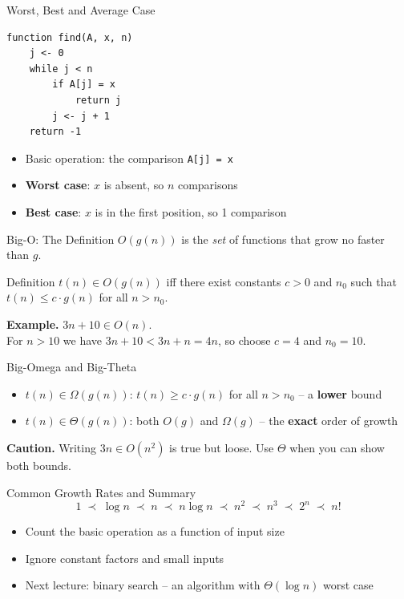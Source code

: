 \documentclass[aspectratio=169,11pt]{beamer}
\begin{document}
\begin{frame}[fragile]{Worst, Best and Average Case}
\begin{verbatim}
function find(A, x, n)
    j <- 0
    while j < n
        if A[j] = x
            return j
        j <- j + 1
    return -1
\end{verbatim}
  \begin{itemize}
    \item Basic operation: the comparison \verb|A[j] = x|
    \item \textbf{Worst case}: $x$ is absent, so $n$ comparisons
    \item \textbf{Best case}: $x$ is in the first position, so 1 comparison
  \end{itemize}
\end{frame}

\begin{frame}{Big-O: The Definition}
  $O(g(n))$ is the \emph{set} of functions that grow no faster than $g$.
  \begin{block}{Definition}
    $t(n) \in O(g(n))$ iff there exist constants $c > 0$ and $n_0$ such that
    $t(n) \le c \cdot g(n)$ for all $n > n_0$.
  \end{block}
  \textbf{Example.} $3n + 10 \in O(n)$.\\
  For $n > 10$ we have $3n + 10 < 3n + n = 4n$, so choose $c = 4$ and $n_0 = 10$.
\end{frame}

\begin{frame}{Big-Omega and Big-Theta}
  \begin{itemize}
    \item $t(n) \in \Omega(g(n))$: $t(n) \ge c \cdot g(n)$ for all $n > n_0$ -- a \textbf{lower} bound
    \item $t(n) \in \Theta(g(n))$: both $O(g)$ and $\Omega(g)$ -- the \textbf{exact} order of growth
  \end{itemize}
  \bigskip
  \textbf{Caution.} Writing $3n \in O(n^2)$ is true but loose.
  Use $\Theta$ when you can show both bounds.
\end{frame}

\begin{frame}{Common Growth Rates and Summary}
  \[
    1 \;\prec\; \log n \;\prec\; n \;\prec\; n\log n \;\prec\; n^2 \;\prec\; n^3 \;\prec\; 2^n \;\prec\; n!
  \]
  \begin{itemize}
    \item Count the basic operation as a function of input size
    \item Ignore constant factors and small inputs
    \item Next lecture: binary search -- an algorithm with $\Theta(\log n)$ worst case
  \end{itemize}
\end{frame}
\end{document}
